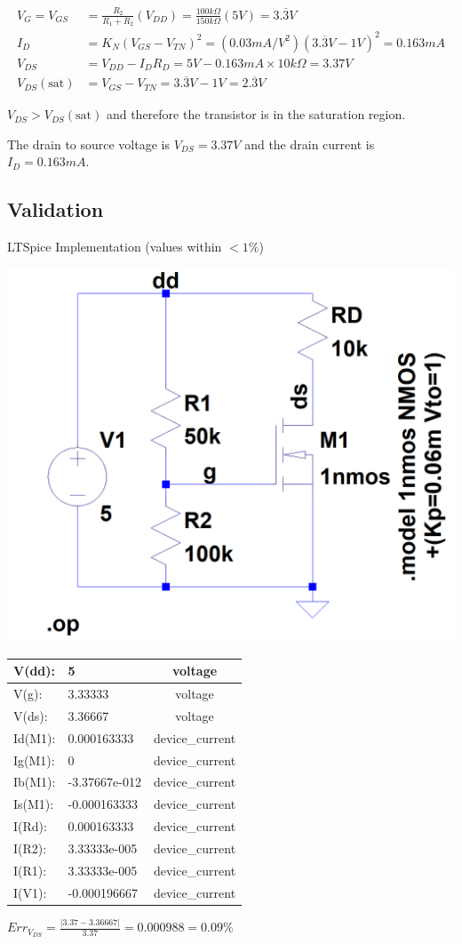 \documentclass[12pt,letterpaper,titlepage]{article}
\begin{document}
\begin{raggedright}
\begin{align*}
   V_G = V_{GS}
     &= \frac{R_2}{R_1 + R_2}(V_{DD})
      = \frac{100k\Omega}{150k\Omega}(5V)
      = 3.\overline{3}V
\\ I_D
	 &= K_N(V_{GS} - V_{TN})^2
	  = (0.03mA/V^2)(3.\overline{3}V - 1V)^2
	  = 0.163mA
\\ V_{DS}
	 &= V_{DD} - I_DR_D
	  = 5V - 0.163mA \times 10k\Omega
	  = 3.37V
\\ V_{DS}(\text{sat})
	 &= V_{GS} - V_{TN}
	  = 3.\overline{3}V - 1V
	  = 2.\overline{3}V
\end{align*}

$V_{DS} > V_{DS}(\text{sat})$ and therefore the transistor is in the saturation region. 

The drain to source voltage is $V_{DS} = 3.37V$ and the drain current is $I_D = 0.163mA$.

\clearpage
\subsection{Validation}

\begin{center}
LTSpice Implementation (values within $<1\%$)
\begin{paracol}{2}
\includegraphics[width=.48\textwidth, height=\textheight, keepaspectratio=true]{ds1b}
\switchcolumn
\begin{tabular}{|l|l|c|}
  \hline V(dd):	& 5	            & voltage
\\\hline V(g):	& 3.33333	    & voltage
\\\hline V(ds):	& 3.36667	    & voltage
\\\hline Id(M1):& 0.000163333	& device\_current
\\\hline Ig(M1):& 0	            & device\_current
\\\hline Ib(M1):& -3.37667e-012	& device\_current
\\\hline Is(M1):& -0.000163333	& device\_current
\\\hline I(Rd):	& 0.000163333	& device\_current
\\\hline I(R2):	& 3.33333e-005	& device\_current
\\\hline I(R1):	& 3.33333e-005	& device\_current
\\\hline I(V1):	& -0.000196667	& device\_current
\\\hline
\end{tabular}
\end{paracol}
$Err_{V_{DS}} = \frac{|3.37-3.36667|}{3.37} = 0.000988 = 0.09\%$


\end{center}
\end{raggedright}
\end{document}
